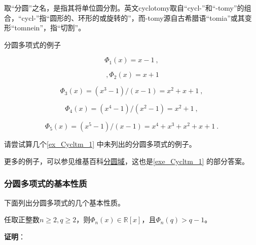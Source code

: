 取“分圆”之名，是指其将单位圆分割。英文cyclotomy取自“cycl-”和“-tomy”的组合，“cycl-”指“圆形的、环形的或旋转的”，而-tomy源自古希腊语“tomia”或其变形“tomnein”，指“切割”。




\begin{example}{分圆多项式的例子}\label{ex_Cycltm_1}

\begin{equation}
\Phi_1(x) = x-1~,
\end{equation}

\begin{equation}\label{eq_Cycltm_2}~,
\Phi_2(x) = x+1
\end{equation}

\begin{equation}
\Phi_3(x) = (x^3-1)/(x-1) = x^2+x+1~,
\end{equation}

\begin{equation}
\Phi_4(x) = (x^4-1)/(x^2-1) = x^2+1~,
\end{equation}

\begin{equation}
\Phi_5(x) = (x^5-1)/(x-1) = x^4+x^3+x^2+x+1~.
\end{equation}


\end{example}

\begin{exercise}{}\label{exe_Cycltm_1}
请尝试算几个\autoref{ex_Cycltm_1} 中未列出的分圆多项式的例子。
\end{exercise}

更多的例子，可以参见维基百科\href{https://en.wikipedia.org/wiki/Cyclotomic_polynomial#Examples}{分圆域}，这也是\autoref{exe_Cycltm_1} 的部分答案。





\subsubsection{分圆多项式的基本性质}


下面列出分圆多项式的几个基本性质。

\begin{theorem}{}
任取正整数$n\geq 2, q\geq 2$，则$\Phi_n(x)\in\mathbb{R}[x]$，且$\Phi_n(q)>q-1$。
\end{theorem}

\textbf{证明}：

